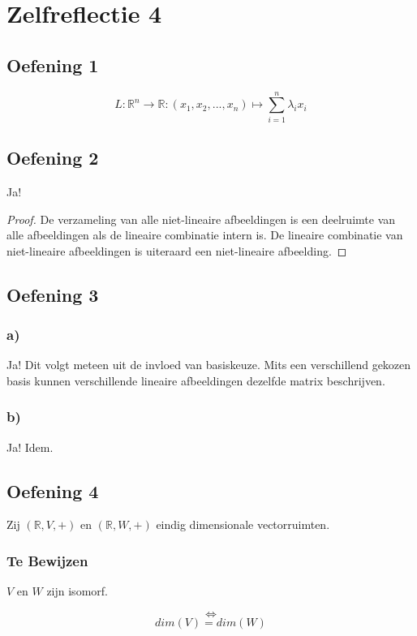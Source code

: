 \documentclass[lineaire_algebra_oplossingen.tex]{subfiles}
\begin{document}
\section{Zelfreflectie 4}

\subsection{Oefening 1}
\[
L: \mathbb{R}^n \rightarrow \mathbb{R}: (x_1,x_2,...,x_n) \mapsto \sum_{i=1}^n\lambda_ix_i
\]

\subsection{Oefening 2}
Ja!
\begin{proof}
De verzameling van alle niet-lineaire afbeeldingen is een deelruimte van alle afbeeldingen als de lineaire combinatie intern is. De lineaire combinatie van niet-lineaire afbeeldingen is uiteraard een niet-lineaire afbeelding.
\end{proof}

\subsection{Oefening 3}
\subsubsection*{a)}
Ja! Dit volgt meteen uit de invloed van basiskeuze. Mits een verschillend gekozen basis kunnen verschillende lineaire afbeeldingen dezelfde matrix beschrijven.

\subsubsection*{b)}
Ja! Idem.

\subsection{Oefening 4}
Zij $(\mathbb{R},V,+)$ en $(\mathbb{R},W,+)$ eindig dimensionale vectorruimten.
\subsubsection*{Te Bewijzen}
\begin{center}
$V$ en $W$ zijn isomorf.
\end{center}
\[\Leftrightarrow\]
\[dim(V)=dim(W)\]
\end{document}
